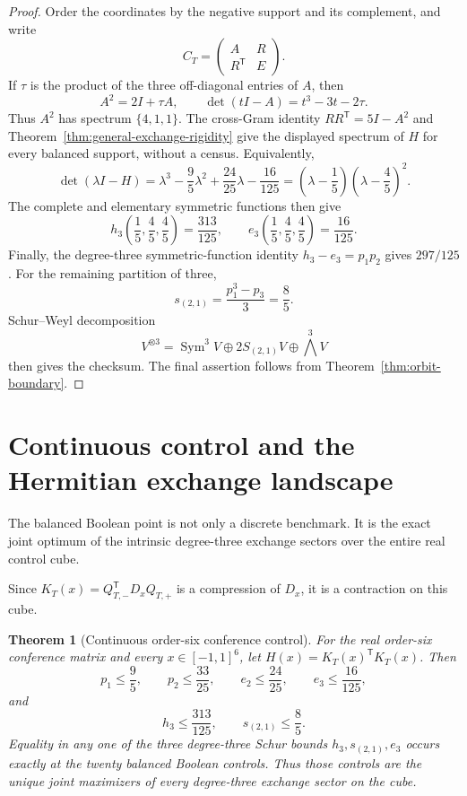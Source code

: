 \documentclass[11pt]{article}
\newtheorem{theorem}{Theorem}[section]
\theoremstyle{remark}
\newcommand{\Sym}{\operatorname{Sym}}
\begin{document}
\begin{proof}
Order the coordinates by the negative support and its complement, and write
\[
 C_T=\begin{pmatrix}A&R\\R^{\mathsf T}&E\end{pmatrix}.
\]
If \(\tau\) is the product of the three off-diagonal entries of \(A\), then
\[
 A^2=2I+\tau A,
 \qquad \det(tI-A)=t^3-3t-2\tau.
\]
Thus \(A^2\) has spectrum \(\{4,1,1\}\).  The cross-Gram identity
\(RR^{\mathsf T}=5I-A^2\) and
Theorem~\ref{thm:general-exchange-rigidity} give the displayed spectrum of
\(H\) for every balanced support, without a census.  Equivalently,
\begin{equation}
\label{eq:balanced-characteristic-polynomial}
 \det(\lambda I-H)
 =\lambda^3-\frac95\lambda^2+\frac{24}{25}\lambda-\frac{16}{125}
 =\left(\lambda-\frac15\right)\left(\lambda-\frac45\right)^2.
\end{equation}
The complete and elementary symmetric functions then give
\[
 h_3\left(\frac15,\frac45,\frac45\right)=\frac{313}{125},
 \qquad
 e_3\left(\frac15,\frac45,\frac45\right)=\frac{16}{125}.
\]
Finally, the degree-three symmetric-function identity
\(h_3-e_3=p_1p_2\) gives \(297/125\).
For the remaining partition of three,
\[
 s_{(2,1)}=\frac{p_1^3-p_3}{3}=\frac85.
\]
Schur--Weyl decomposition
\[
 V^{\otimes3}=\Sym^3V\oplus
 2S_{(2,1)}V\oplus\bigwedge^3V
\]
then gives the checksum.  The final assertion follows from
Theorem~\ref{thm:orbit-boundary}.
\end{proof}

\section{Continuous control and the Hermitian exchange landscape}

The balanced Boolean point is not only a discrete benchmark.  It is the exact
joint optimum of the intrinsic degree-three exchange sectors over the entire
real control cube.

Since \(K_T(x)=Q_{T,-}^{\mathsf T}D_xQ_{T,+}\) is a compression of
\(D_x\), it is a contraction on this cube.

\begin{theorem}[Continuous order-six conference control]
\label{thm:continuous-control}
For the real order-six conference matrix and every
\(x\in[-1,1]^6\), let \(H(x)=K_T(x)^{\mathsf T}K_T(x)\).  Then
\[
 p_1\le\frac95,\qquad p_2\le\frac{33}{25},\qquad
 e_2\le\frac{24}{25},\qquad e_3\le\frac{16}{125},
\]
and
\[
 h_3\le\frac{313}{125},\qquad s_{(2,1)}\le\frac85.
\]
Equality in any one of the three degree-three Schur bounds
\(h_3,s_{(2,1)},e_3\) occurs exactly at the twenty balanced Boolean controls.
Thus those controls are the unique joint maximizers of every degree-three
exchange sector on the cube.
\end{theorem}
\end{document}
